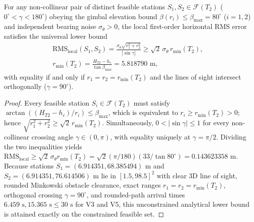\begin{keybox}[top=4pt,bottom=4pt]
\setlength{\abovedisplayskip}{8pt}\setlength{\belowdisplayskip}{8pt}
\begin{proposition}
\label{prop:p21-lb}
For any non-collinear pair of distinct feasible stations $S_1,S_2\in\mathcal{F}(T_2)$ ($0^\circ<\gamma<180^\circ$) obeying the gimbal elevation bound $\beta(r_i)\le\beta_{\max}=80^\circ$ ($i=1,2$) and independent bearing noise $\sigma_\theta>0$, the local first-order horizontal RMS error satisfies the universal lower bound
\[
\begin{gathered}
\mathrm{RMS}_{\mathrm{local}}(S_1,S_2) = \frac{\sigma_\theta\sqrt{r_1^2+r_2^2}}{|\sin\gamma|} \ge \sqrt{2}\,\sigma_\theta\,r_{\min}(T_2),\\
r_{\min}(T_2)=\frac{H_{T2}-h_c}{\tan\beta_{\max}}=5.818790\text{ m},
\end{gathered}
\]
with equality if and only if $r_1=r_2=r_{\min}(T_2)$ and the lines of sight intersect orthogonally ($\gamma=90^\circ$).
\end{proposition}
\end{keybox}

\begin{proof}
Every feasible station $S_i\in\mathcal{F}(T_2)$ must satisfy $\arctan((H_{T2}-h_c)/r_i)\le\beta_{\max}$, which is equivalent to $r_i\ge r_{\min}(T_2)>0$; hence $\sqrt{r_1^2+r_2^2}\ge\sqrt{2}\,r_{\min}(T_2)$. Simultaneously, $0<|\sin\gamma|\le 1$ for every non-collinear crossing angle $\gamma\in(0,\pi)$, with equality uniquely at $\gamma=\pi/2$. Dividing the two inequalities yields $\mathrm{RMS}_{\mathrm{local}}\ge\sqrt{2}\,\sigma_\theta r_{\min}(T_2)=\sqrt{2}(\pi/180)(33/\tan 80^\circ)=0.143623358\text{ m}$. Because stations $S_1=(6.914351,68.385494)$ m and $S_2=(6.914351,76.614506)$ m lie in $[1.5,98.5]^2$ with clear 3D line of sight, rounded Minkowski obstacle clearance, exact ranges $r_1=r_2=r_{\min}(T_2)$, orthogonal crossing $\gamma=90^\circ$, and rounded-path arrival times $6.459\text{ s},15.365\text{ s}\le 30\text{ s}$ for V3 and V5, this unconstrained analytical lower bound is attained exactly on the constrained feasible set.
\end{proof}

